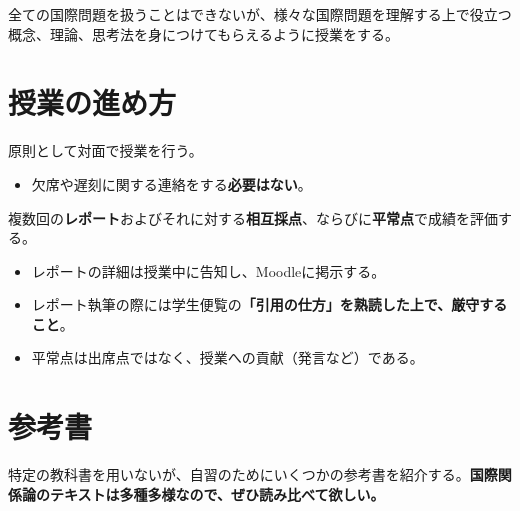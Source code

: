 \documentclass[
  xelatex,
  ja=standard]{bxjsarticle}
\providecommand{\tightlist}{%
  \setlength{\itemsep}{0pt}\setlength{\parskip}{0pt}}\usepackage{longtable,booktabs,array}
\begin{document}
\begin{tcolorbox}[enhanced jigsaw, titlerule=0mm, colback=white, breakable, opacityback=0, rightrule=.15mm, coltitle=black, title=\textcolor{quarto-callout-warning-color}{\faExclamationTriangle}\hspace{0.5em}{カバーできないトピック}, bottomtitle=1mm, left=2mm, colbacktitle=quarto-callout-warning-color!10!white, toptitle=1mm, opacitybacktitle=0.6, colframe=quarto-callout-warning-color-frame, arc=.35mm, bottomrule=.15mm, leftrule=.75mm, toprule=.15mm]

全ての国際問題を扱うことはできないが、様々な国際問題を理解する上で役立つ概念、理論、思考法を身につけてもらえるように授業をする。

\end{tcolorbox}

\hypertarget{ux6388ux696dux306eux9032ux3081ux65b9}{%
\section{授業の進め方}\label{ux6388ux696dux306eux9032ux3081ux65b9}}

原則として対面で授業を行う。

\begin{itemize}
\tightlist
\item
  欠席や遅刻に関する連絡をする\textbf{必要はない}。
\end{itemize}

複数回の\textbf{レポート}およびそれに対する\textbf{相互採点}、ならびに\textbf{平常点}で成績を評価する。

\begin{itemize}
\tightlist
\item
  レポートの詳細は授業中に告知し、Moodleに掲示する。
\item
  レポート執筆の際には学生便覧の\textbf{「引用の仕方」を熟読した上で、厳守すること}。
\item
  平常点は出席点ではなく、授業への貢献（発言など）である。
\end{itemize}

\hypertarget{ux53c2ux8003ux66f8}{%
\section{参考書}\label{ux53c2ux8003ux66f8}}

特定の教科書を用いないが、自習のためにいくつかの参考書を紹介する。\textbf{国際関係論のテキストは多種多様なので、ぜひ読み比べて欲しい。}
\end{document}
